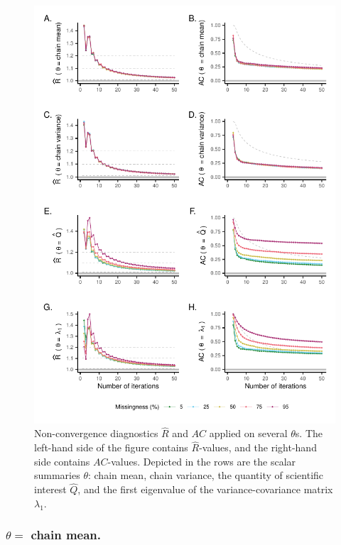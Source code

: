 \documentclass[Royal,times,sageh]{sagej}
\begin{document}
\begin{figure}

{\centering \includegraphics{2.Manuscript_files/figure-latex/rhats-acs-1} 

}

\caption{Non-convergence diagnostics $\widehat{R}$ and $AC$ applied on several $\theta$s. The left-hand side of the figure contains $\widehat{R}$-values, and the right-hand side contains $AC$-values. Depicted in the rows are the scalar summaries $\theta$: chain mean, chain variance, the quantity of scientific interest $\hat{Q}$, and the first eigenvalue of the variance-covariance matrix $\lambda_1$.}\label{fig:rhats-acs}
\end{figure}

\hypertarget{theta-chain-mean.}{%
\subsubsection{\texorpdfstring{\(\theta=\) chain mean.}{\textbackslash theta= chain mean.}}\label{theta-chain-mean.}}
\end{document}
